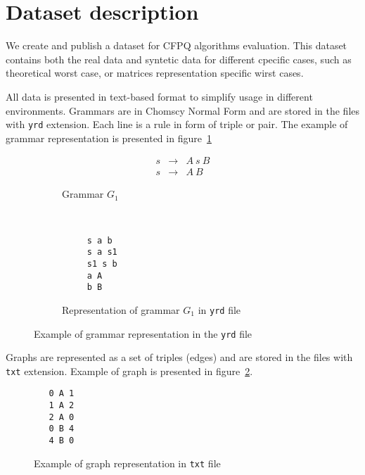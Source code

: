 \section{Dataset description}

We create and publish a dataset for CFPQ algorithms evaluation.
This dataset contains both the real data and syntetic data for different cpecific cases, such as theoretical worst case, or matrices representation specific wirst cases.

All data is presented in text-based format to simplify usage in different environments.
Grammars are in Chomscy Normal Form and are stored in the files with \verb|yrd| extension.
Each line is a rule in form of triple or pair. 
The example of grammar representation is presented in figure~\ref{fig:grammar_example}


\begin{figure}[h]
    \centering
    \begin{subfigure}[b]{0.24\textwidth}
        \centering
        \[
         \begin{array}{rcl}
           s & \rightarrow & A \ s \ B \\
           s & \rightarrow & A \ B 
         \end{array}        
         \]
        \caption{Grammar $G_1$}
    \end{subfigure}%
    ~ 
    \begin{subfigure}[b]{0.24\textwidth}
        \centering
        \begin{verbatim}
     s a b
     s a s1
     s1 s b
     a A
     b B
        \end{verbatim}
        \caption{Representation of grammar $G_1$ in \texttt{yrd} file}
    \end{subfigure}
    \caption{Example of grammar representation in the \texttt{yrd} file}
    \label{fig:grammar_example}
\end{figure}



Graphs are represented as a set of triples (edges) and are stored in the files with \verb|txt| extension. 
Example of graph is presented in figure~\ref{fig:graph_example}.

\begin{figure}[h]
 \begin{verbatim}
   0 A 1
   1 A 2
   2 A 0
   0 B 4
   4 B 0
 \end{verbatim}

 \label{fig:graph_example}
 \caption{Example of graph representation in \texttt{txt} file}
\end{figure}

